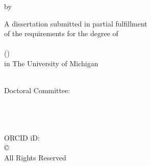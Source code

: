 \thispagestyle{empty}


\begin{center}
        \Huge
        \thesistitle

        \vspace{12pt}

        \Large
        by

        \vspace{12pt}

        \thesisauthor

        \vspace{0.5in}

        \Large
        A dissertation submitted in partial fulfillment \\
        of the requirements for the degree of \\
        \thesisdegree \\
        (\thesisdepartment) \\
        in The University of Michigan \\
        \thesisyear \\

\end{center}

\vfill
\Large
\noindent Doctoral Committee:
\\
\\
\thesiscommittee

\normalsize
\restoregeometry
\newpage
\thispagestyle{empty}






\hspace{0pt}
\vfill
\begin{center}
        \thesisauthor \\
        \thesisemail \\
        ORCID iD: \thesisorcid \\
        \vspace{1in}
        \copyright\hspace{0.2in}{\thesisauthor}\hspace{0.2in}\thesisyear\\ %
        \vspace{0.1in}All Rights Reserved
\end{center}
\vfill
\hspace{0pt}

